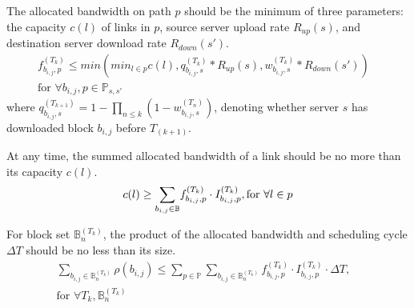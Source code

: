 \begin{packeditemize}

\item The allocated bandwidth on path $p$ should be the minimum of three parameters: the capacity $c(l)$ of links in $p$, source server upload rate $R_{up}(s)$, and destination server download rate $R_{down}(s')$.%
\begin{equation}
\begin{split}
f^{(T_k)}_{b_{i,j},p} \leq min\left(min_{l\in p} c(l), q_{b_{i,j},s}^{(T_k)}*R_{up}(s), w_{b_{i,j},s}^{(T_k)}*R_{down}(s')\right) &\\
\text{for }\forall b_{i,j}, p\in \mathbb{P}_{s,s'} &%
\end{split}
\end{equation}
where $q_{b_{i,j},s}^{(T_{k+1})} = 1-\prod_{n\leq k} (1-w_{b_{i,j},s}^{(T_n)})$, denoting whether server $s$ has downloaded block $b_{i,j}$ before $T_{(k+1)}$.

\item At any time, the summed allocated bandwidth of a link should be no more than its capacity $c(l)$.
\begin{equation}
c(l) \geq \displaystyle{\sum_{b_{i,j} \in \mathbb{B}}} f^{(T_k)}_{b_{i,j},p} \cdot I^{(T_k)}_{b_{i,j},p}, \text{for }\forall l\in p\\
\end{equation}

\item For block set $\mathbb{B}^{(T_k)}_n$, the product of the allocated bandwidth and scheduling cycle $\Delta T$ should be no less than its size.%
\begin{equation}
\begin{split}
\displaystyle{\sum_{b_{i,j}\in \mathbb{B}^{(T_k)}_n}} \rho(b_{i,j}) \leq \displaystyle{\sum_{p\in \mathbb{P}}} \displaystyle{\sum_{b_{i,j} \in \mathbb{B}^{(T_k)}_n}} f^{(T_k)}_{b_{i,j},p} \cdot I^{(T_k)}_{b_{i,j},p} \cdot \Delta T,& \\
\text{for }\forall T_k, \mathbb{B}^{(T_k)}_n &
\end{split}
\end{equation}



\end{packeditemize}
